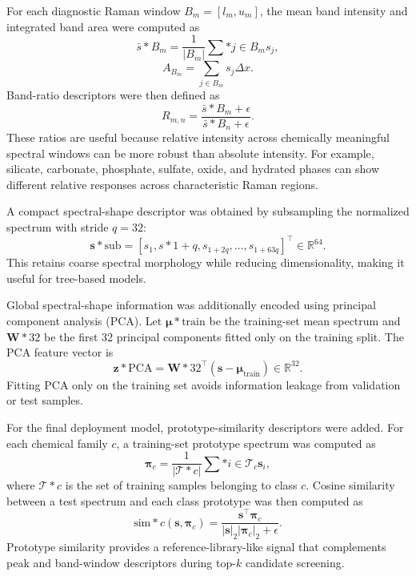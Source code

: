 For each diagnostic Raman window $B_m=[l_m,u_m]$, the mean band intensity and integrated band area were computed as
\begin{equation}
\bar{s}*{B_m}=
\frac{1}{|B_m|}\sum*{j\in B_m}s_j,
\end{equation}
\begin{equation}
A_{B_m}=
\sum_{j\in B_m}s_j\Delta x.
\end{equation}
Band-ratio descriptors were then defined as
\begin{equation}
R_{m,n}=
\frac{\bar{s}*{B_m}+\epsilon}
{\bar{s}*{B_n}+\epsilon}.
\end{equation}
These ratios are useful because relative intensity across chemically meaningful spectral windows can be more robust than absolute intensity. For example, silicate, carbonate, phosphate, sulfate, oxide, and hydrated phases can show different relative responses across characteristic Raman regions.

A compact spectral-shape descriptor was obtained by subsampling the normalized spectrum with stride $q=32$:
\begin{equation}
\mathbf{s}*{\mathrm{sub}}=
[s_1,s*{1+q},s_{1+2q},\ldots,s_{1+63q}]^\top
\in \mathbb{R}^{64}.
\end{equation}
This retains coarse spectral morphology while reducing dimensionality, making it useful for tree-based models.

Global spectral-shape information was additionally encoded using principal component analysis (PCA). Let $\boldsymbol{\mu}*{\mathrm{train}}$ be the training-set mean spectrum and $\mathbf{W}*{32}$ be the first 32 principal components fitted only on the training split. The PCA feature vector is
\begin{equation}
\mathbf{z}*{\mathrm{PCA}}=
\mathbf{W}*{32}^{\top}(\mathbf{s}-\boldsymbol{\mu}_{\mathrm{train}})
\in \mathbb{R}^{32}.
\end{equation}
Fitting PCA only on the training set avoids information leakage from validation or test samples.

For the final deployment model, prototype-similarity descriptors were added. For each chemical family $c$, a training-set prototype spectrum was computed as
\begin{equation}
\boldsymbol{\pi}_c=
\frac{1}{|\mathcal{T}*c|}
\sum*{i\in\mathcal{T}_c}\mathbf{s}_i,
\end{equation}
where $\mathcal{T}*c$ is the set of training samples belonging to class $c$. Cosine similarity between a test spectrum and each class prototype was then computed as
\begin{equation}
\mathrm{sim}*{c}(\mathbf{s},\boldsymbol{\pi}_c)=
\frac{\mathbf{s}^{\top}\boldsymbol{\pi}_c}
{|\mathbf{s}|_2|\boldsymbol{\pi}_c|_2+\epsilon}.
\end{equation}
Prototype similarity provides a reference-library-like signal that complements peak and band-window descriptors during top-$k$ candidate screening.

